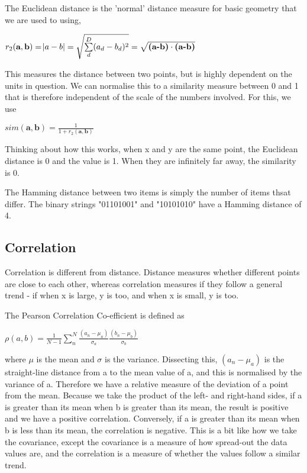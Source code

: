 \documentclass[10pt,a4paper]{article}
\begin{document}
		The Euclidean distance is the 'normal' distance measure for basic geometry that we are used to using,
		\begin{center}
			$
			r_{2}(\textbf{a}, \textbf{b}) = \abs{a-b} = \sqrt{\sum\limits_d^D(a_{d} - b_{d})^{2}} = \sqrt{\textbf{(a-b)}\cdot\textbf{(a-b)}}
			$
		\end{center}
		
		This measures the distance between two points, but is highly dependent on the units in question. We can normalise this to a similarity measure between 0 and 1 that is therefore independent of the scale of the numbers involved. For this, we use
		\begin{center}
\textsc{			$sim(\textbf{a}, \textbf{b}) = \frac{1}{1+r_2(\textbf{a}, \textbf{b})}$}
		\end{center}
		Thinking about how this works, when x and y are the same point, the Euclidean distance is 0 and the value is 1. When they are infinitely far away, the similarity is 0.
		
		The Hamming distance between two items is simply the number of items thsat differ. The binary strings "01101001" and "10101010" have a Hamming distance of 4.
		\subsection{Correlation}
			Correlation is different from distance. Distance measures whether different points are close to each other, whereas correlation measures if they follow a general trend - if when x is large, y is too, and when x is small, y is too. 
			
			The Pearson Correlation Co-efficient is defined as 
			\begin{center}
				$\rho(a, b) = 
				\frac{1}{N-1} \sum\limits_n^N
				\frac{(a_n - \mu_a)}{\sigma_a}
				\frac{(b_n - \mu_b)}{\sigma_b} $				
			\end{center}
			where $\mu$ is the mean and $\sigma$ is the variance. Dissecting this, $(a_n - \mu_a)$
			 is the straight-line distance from a to the mean value of a, and this is normalised by the variance of a. Therefore we have a relative measure of the deviation of a point from the mean. Because we take the product of the left- and right-hand sides, if a is greater than its mean when b is greater than its mean, the result is positive and we have a positive correlation. Conversely, if a is greater than its mean when b is less than its mean, the correlation is negative. This is a bit like how we take the covariance, except the covariance is a measure of how spread-out the data values are, and the correlation is a measure of whether the values follow a similar trend.
			 
\end{document}
